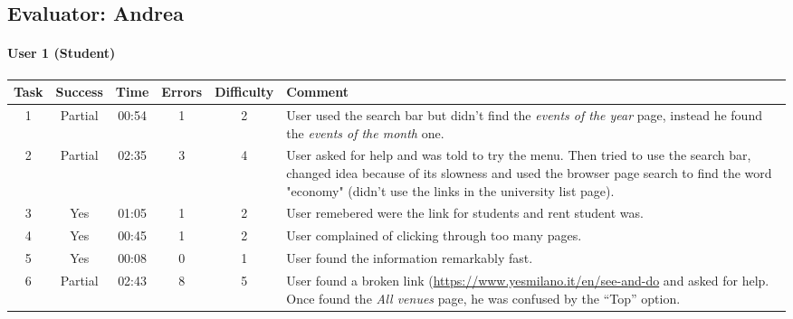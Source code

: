 \begin{small}
\pagebreak

\subsection{Evaluator: Andrea}

\paragraph{User 1 (Student)}
\begin{tabularx}{\linewidth}{c c c c c X}
    \toprule
    \textbf{Task} & \textbf{Success} & \textbf{Time}
     & \textbf{Errors} & \textbf{Difficulty} & \textbf{Comment} \\
    \midrule
    1 & Partial & 00:54 & 1 & 2 & User used the search bar but didn't find the \emph{events of the year} page, instead he found the \emph{events of the month} one. \\ \midrule
    2 & Partial & 02:35 & 3 & 4 & User asked for help and was told to try the menu. Then tried to use the search bar, changed idea because of its slowness and used the browser page search to find the word "economy" (didn't use the links in the university list page). \\ \midrule
    3 & Yes & 01:05 & 1 & 2 & User remebered were the link for students and rent student was. \\ \midrule
    4 & Yes & 00:45 & 1 & 2 & User complained of clicking through too many pages. \\ \midrule
    5 & Yes & 00:08 & 0 & 1 & User found the information remarkably fast. \\ \midrule
    6 & Partial & 02:43 & 8 & 5 & User found a broken link (\href{"Info on museums - art venues open"}{https://www.yesmilano.it/en/see-and-do} and asked for help. Once found the \emph{All venues} page, he was confused by the ``Top'' option. \\ \bottomrule
\end{tabularx}


\end{small}
